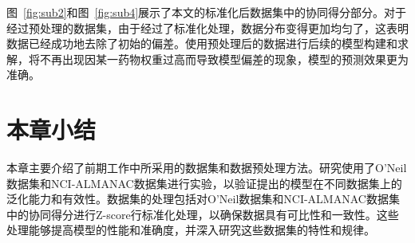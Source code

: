 图~\ref{fig:sub2}和图~\ref{fig:sub4}展示了本文的标准化后数据集中的协同得分部分。对于经过预处理的数据集，由于经过了标准化处理，数据分布变得更加均匀了，这表明数据已经成功地去除了初始的偏差。使用预处理后的数据进行后续的模型构建和求解，将不再出现因某一药物权重过高而导致模型偏差的现象，模型的预测效果更为准确。

\section{本章小结}

本章主要介绍了前期工作中所采用的数据集和数据预处理方法。研究使用了O'Neil数据集和NCI-ALMANAC数据集进行实验，以验证提出的模型在不同数据集上的泛化能力和有效性。数据集的处理包括对O'Neil数据集和NCI-ALMANAC数据集中的协同得分进行Z-score行标准化处理，以确保数据具有可比性和一致性。这些处理能够提高模型的性能和准确度，并深入研究这些数据集的特性和规律。